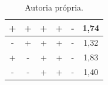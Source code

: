 \begin{table}[H]
\begin{tabular}{|c|c|c|c|c|c|}
  +              & +               & +                & +                 & -                  & 1,74           \\ \hline
  \rowcolor[HTML]{EFEFEF} 
  -              & +               & +                & +                 & -                  & 1,32           \\ \hline
  +              & -               & +                & +                 & -                  & 1,83           \\ \hline
  \rowcolor[HTML]{EFEFEF} 
  -              & -               & +                & +                 & -                  & 1,40           \\ \hline
  \end{tabular}
  \label{tab:dados_experimento}
  \caption*{Autoria própria.}
\end{table}